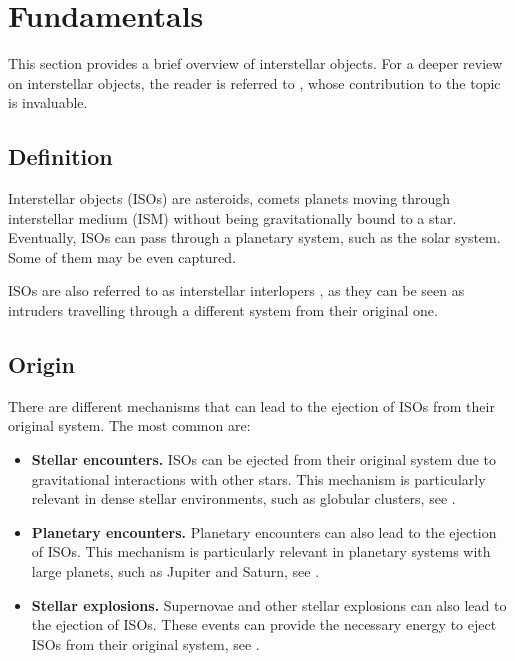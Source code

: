 \section{Fundamentals}

This section provides a brief overview of interstellar objects. For a deeper
review on interstellar objects, the reader is referred to \cite{jewitt2022},
whose contribution to the topic is invaluable.

\subsection{Definition}
Interstellar objects (ISOs) are asteroids, comets planets moving through
interstellar medium (ISM) without being gravitationally bound to a star.
Eventually, ISOs can pass through a planetary system, such as the solar system.
Some of them may be even captured.

ISOs are also referred to as interstellar interlopers \cite{jewitt2022}, as they
can be seen as intruders travelling through a different system from their
original one.

\subsection{Origin}
There are different mechanisms that can lead to the ejection of ISOs from their
original system. The most common are:

\begin{itemize}
  \item \textbf{Stellar encounters.} ISOs can be ejected from their original
        system due to gravitational interactions with other stars. This
        mechanism is particularly relevant in dense stellar environments, such
        as globular clusters, see \cite{eloy2022}.

  \item \textbf{Planetary encounters.} Planetary encounters can also lead to
        the ejection of ISOs. This mechanism is particularly relevant in
        planetary systems with large planets, such as Jupiter and Saturn, see
        \cite{kaib2011}.

  \item \textbf{Stellar explosions.} Supernovae and other stellar explosions
        can also lead to the ejection of ISOs. These events can provide the
        necessary energy to eject ISOs from their original system, see
        \cite{portegies2018}.
\end{itemize}

